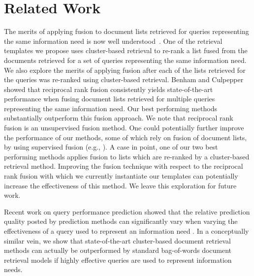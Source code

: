 \section{Related Work}
\label{sec:rel}
The merits of applying fusion to document lists retrieved for queries
representing the same information need is now well
understood~\cite{Belkin+al:93a,Belkin+al:95a,Pickens+al:08a,bailey2017retrieval,bc17-adcs,Benham+al:19a}.
One of the retrieval templates we propose uses cluster-based retrieval
to re-rank a list fused from the documents retrieved for a set of
queries representing the same information need.  We also explore the
merits of applying fusion after each of the lists retrieved for the
queries was re-ranked using cluster-based retrieval.  Benham and
Culpepper \cite{bc17-adcs} showed that reciprocal rank fusion
\cite{Cormack+al:09a} consistently yields state-of-the-art performance
when fusing document lists retrieved for multiple queries representing
the same information need.  Our best performing methods substantially
outperform this fusion approach. We note that reciprocal rank fusion
is an unsupervised fusion method. One could potentially further
improve the performance of our methods, some of which rely on fusion
of document lists, by using supervised fusion (e.g.,
\cite{Sheldon+al:11a}). A case in point, one of our two best
performing methods applies fusion to lists which are re-ranked by a
cluster-based retrieval method. Improving the fusion technique with
respect to the reciprocal rank fusion with which we currently instantiate our
templates can potentially increase the effectiveness of this method. We leave this exploration for future work.


Recent work on query performance prediction showed that the relative
prediction quality posted by prediction methods can significantly
vary when varying the effectiveness of a query used to represent an
information need \cite{Zendel+al:19a}.
In a conceptually similar vein, we show that state-of-the-art
cluster-based document retrieval methods can actually be outperformed
by standard bag-of-words document retrieval models if highly
effective queries are used to represent information needs.

